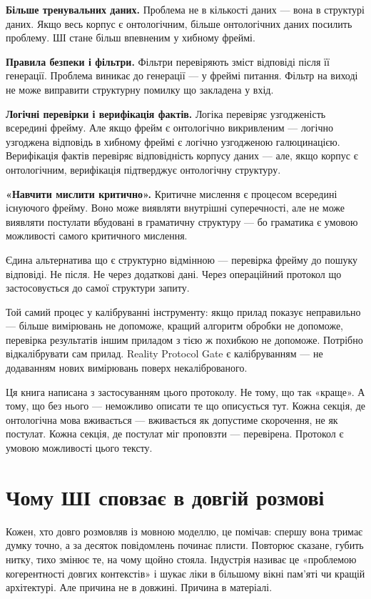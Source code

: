 \documentclass[12pt, a4paper, openany]{book}
\begin{document}
\textbf{Більше тренувальних даних.} Проблема не в кількості даних — вона в структурі даних. Якщо весь корпус є онтологічним, більше онтологічних даних посилить проблему. ШІ стане більш впевненим у хибному фреймі.

\textbf{Правила безпеки і фільтри.} Фільтри перевіряють зміст відповіді після її генерації. Проблема виникає до генерації — у фреймі питання. Фільтр на виході не може виправити структурну помилку що закладена у вхід.

\textbf{Логічні перевірки і верифікація фактів.} Логіка перевіряє узгодженість всередині фрейму. Але якщо фрейм є онтологічно викривленим — логічно узгоджена відповідь в хибному фреймі є логічно узгодженою галюцинацією. Верифікація фактів перевіряє відповідність корпусу даних — але, якщо корпус є онтологічним, верифікація підтверджує онтологічну структуру.

\textbf{«Навчити мислити критично».} Критичне мислення є процесом всередині існуючого фрейму. Воно може виявляти внутрішні суперечності, але не може виявляти постулати вбудовані в граматичну структуру — бо граматика є умовою можливості самого критичного мислення.

Єдина альтернатива що є структурно відмінною — перевірка фрейму до пошуку відповіді. Не після. Не через додаткові дані. Через операційний протокол що застосовується до самої структури запиту.

\begin{analogybox}
Той самий процес у калібруванні інструменту: якщо прилад показує неправильно — більше вимірювань не допоможе, кращий алгоритм обробки не допоможе, перевірка результатів іншим приладом з тією ж похибкою не допоможе. Потрібно відкалібрувати сам прилад. Reality Protocol Gate є калібруванням — не додаванням нових вимірювань поверх некаліброваного.
\end{analogybox}

Ця книга написана з застосуванням цього протоколу. Не тому, що так «краще». А тому, що без нього — неможливо описати те що описується тут. Кожна секція, де онтологічна мова вживається — вживається як допустиме скорочення, не як постулат. Кожна секція, де постулат міг проповзти — перевірена. Протокол є умовою можливості цього тексту.

\section{Чому ШІ сповзає в довгій розмові}

Кожен, хто довго розмовляв із мовною моделлю, це помічав: спершу вона тримає думку точно, а за десяток повідомлень починає плисти. Повторює сказане, губить нитку, тихо змінює те, на чому щойно стояла. Індустрія називає це «проблемою когерентності довгих контекстів» і шукає ліки в більшому вікні пам'яті чи кращій архітектурі. Але причина не в довжині. Причина в матеріалі.
\end{document}
